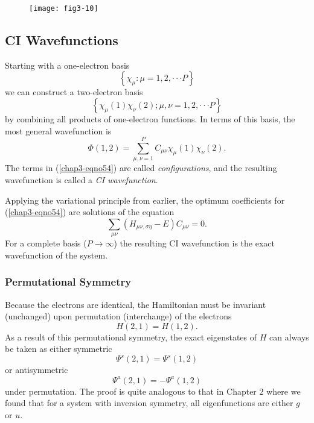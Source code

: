 \begin{figure}
\begin{center}
\texttt{[image: fig3-10]}
\end{center}
\caption{}
\label{fig3-11}
\end{figure}

\subsection{CI Wavefunctions}

Starting with a one-electron basis
\begin{equation}
\left\{ \chi_{\mu} : \mu = 1 , 2 , \cdot \cdot \cdot  P \right\}
\end{equation}
we can construct a two-electron basis
\begin{equation}
\left\{ \chi_{\mu} (1) \chi_{\nu} (2) ; \mu , \nu = 1 , 2 , \cdot 
\cdot \cdot P \right\}
\end{equation}
by combining all products of one-electron functions. In terms of this 
basis, the most general wavefunction is
\begin{equation}
\Phi (1,2) = \sum^P_{\mu , \nu = 1} C_{\mu \nu} \chi_{\mu} (1) 
\chi_{\nu} (2) .
\label{chap3-eqno54}
\end{equation}
The terms in (\ref{chap3-eqno54}) are called \emph{configurations},
and the resulting wavefunction is called a \emph{CI wavefunction}.


Applying the variational principle from earlier, the optimum
coefficients for (\ref{chap3-eqno54}) are solutions of the equation
\begin{equation}
\sum_{\mu\nu}(H_{\mu\nu,\sigma\eta}-E)C_{\mu\nu} = 0.
\end{equation}
For a complete basis ($P \rightarrow \infty$) the resulting CI
wavefunction is the exact wavefunction of the system.

\subsubsection{Permutational Symmetry}

Because the electrons are identical, the Hamiltonian must be invariant
(unchanged) upon permutation (interchange) of the electrons
\begin{equation}
H ( 2 , 1 ) = H ( 1 , 2 ).
\label{chap3-eqno55}
\end{equation}
As a result of this permutational symmetry, the exact eigenstates 
of $H$ can always be taken as either symmetric
\begin{equation}
\Psi^s (2,1) = \Psi^s (1,2)
\label{chap3-eqno56}
\end{equation}
or antisymmetric
\begin{equation}
\Psi^a (2,1) = - \Psi^a (1,2)
\end{equation}
under permutation. The proof is quite analogous to that in Chapter 2
where we found that for a system with inversion symmetry, all
eigenfunctions are either $g$ or $u$.


